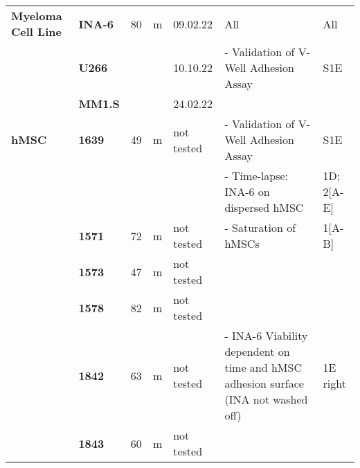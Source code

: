{\begin{longtable}{|>{\bfseries}p{1.5cm}|>{\bfseries}p{1.2cm}|p{1cm}|p{1cm}|p{2.3cm}|p{6cm}|p{1.7cm}|}
    Myeloma Cell Line & INA-6 & 80 & m & 09.02.22   & All                                                                                                      & All                                     \\
    \hhline{~------}
                      & U266  &    &   & 10.10.22   & - Validation of V-Well Adhesion Assay                                                                    & S1E                                     \\
    \hhline{~----~~}
                      & MM1.S &    &   & 24.02.22   &                                                                                                          &                                         \\
    \hline
    hMSC              & 1639  & 49 & m & not tested & - Validation of V-Well Adhesion Assay                                                                    & S1E                                     \\
    \hhline{~~~~~--}
                      &       &    &   &            & - Time-lapse: INA-6 on dispersed hMSC                                                                    & 1D; 2[A-E]                              \\
    \hhline{~------}
                      & 1571  & 72 & m & not tested & - Saturation of hMSCs                                                                                    & 1[A-B]                                  \\
    \hhline{~----~~}
                      & 1573  & 47 & m & not tested &                                                                                                          &                                         \\
    \hhline{~----~~}
                      & 1578  & 82 & m & not tested &                                                                                                          &                                         \\
    \hhline{~------}
                      & 1842  & 63 & m & not tested & - INA-6 Viability dependent on time and hMSC adhesion surface (INA not washed off)                       & 1E right                                \\
    \hhline{~----~~}
                      & 1843  & 60 & m & not tested &                                                                                                          &                                         \\

\end{longtable}}

